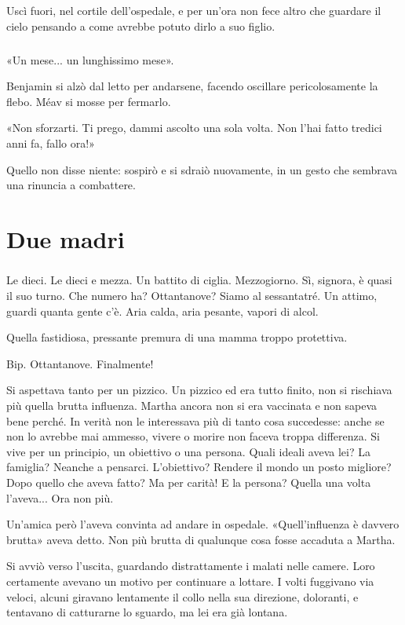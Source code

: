 \documentclass[a4paper,12pt]{book}
\begin{document}
Uscì fuori, nel cortile dell'ospedale, e per un'ora non fece altro che guardare
il cielo pensando a come avrebbe potuto dirlo a suo figlio.

\paragraph{}
«Un mese... un lunghissimo mese».

Benjamin si alzò dal letto per andarsene, facendo oscillare pericolosamente la
flebo. Méav si mosse per fermarlo.

«Non sforzarti. Ti prego, dammi ascolto una sola volta. Non l’hai fatto
tredici anni fa, fallo ora!»

Quello non disse niente: sospirò e si sdraiò nuovamente, in un gesto che
sembrava una rinuncia a combattere.

\chapter{Due madri}

\paragraph{}
Le dieci. Le dieci e mezza. Un battito di ciglia. Mezzogiorno. Sì, signora, è
quasi il suo turno. Che numero ha? Ottantanove? Siamo al sessantatré. Un
attimo, guardi quanta gente c’è. Aria calda, aria pesante, vapori di alcol.

Quella fastidiosa, pressante premura di una mamma troppo protettiva.

Bip. Ottantanove. Finalmente!

Si aspettava tanto per un pizzico. Un pizzico ed era tutto finito, non si
rischiava più quella brutta influenza. Martha ancora non si era vaccinata e non
sapeva bene perché. In verità non le interessava più di tanto cosa
succedesse: anche se non lo avrebbe mai ammesso, vivere o morire non faceva
troppa differenza. Si vive per un principio, un obiettivo o una persona. Quali
ideali aveva lei? La famiglia? Neanche a pensarci. L’obiettivo? Rendere il
mondo un posto migliore? Dopo quello che aveva fatto? Ma per carità! E la
persona? Quella una volta l’aveva... Ora non più.

Un’amica però l’aveva convinta ad andare in ospedale. «Quell’influenza
è davvero brutta» aveva detto. Non più brutta di qualunque cosa fosse
accaduta a Martha.

Si avviò verso l’uscita, guardando distrattamente i malati nelle camere. Loro
certamente avevano un motivo per continuare a lottare. I volti fuggivano via
veloci, alcuni giravano lentamente il collo nella sua direzione, doloranti, e
tentavano di catturarne lo sguardo, ma lei era già lontana.
\end{document}
